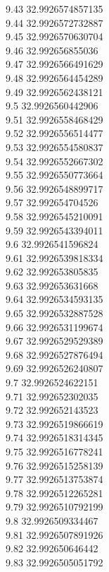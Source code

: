 {9.43	32.9926574857135\\
9.44	32.9926572732887\\
9.45	32.9926570630704\\
9.46	32.992656855036\\
9.47	32.9926566491629\\
9.48	32.9926564454289\\
9.49	32.9926562438121\\
9.5	32.9926560442906\\
9.51	32.9926558468429\\
9.52	32.9926556514477\\
9.53	32.9926554580837\\
9.54	32.9926552667302\\
9.55	32.9926550773664\\
9.56	32.9926548899717\\
9.57	32.992654704526\\
9.58	32.9926545210091\\
9.59	32.9926543394011\\
9.6	32.9926541596824\\
9.61	32.9926539818334\\
9.62	32.992653805835\\
9.63	32.992653631668\\
9.64	32.9926534593135\\
9.65	32.9926532887528\\
9.66	32.9926531199674\\
9.67	32.9926529529389\\
9.68	32.9926527876494\\
9.69	32.9926526240807\\
9.7	32.9926524622151\\
9.71	32.992652302035\\
9.72	32.992652143523\\
9.73	32.9926519866619\\
9.74	32.9926518314345\\
9.75	32.9926516778241\\
9.76	32.9926515258139\\
9.77	32.9926513753874\\
9.78	32.9926512265281\\
9.79	32.9926510792199\\
9.8	32.9926509334467\\
9.81	32.9926507891926\\
9.82	32.992650646442\\
9.83	32.9926505051792\\
}
